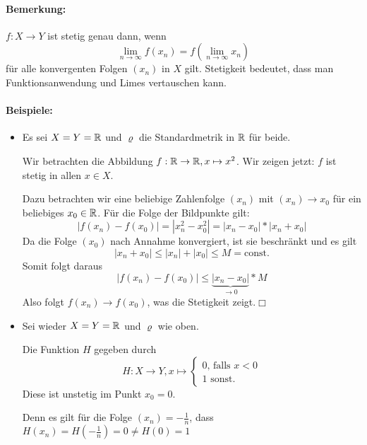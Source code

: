 \paragraph{Bemerkung:}
$f:X\rightarrow Y$ ist stetig genau dann, wenn
\begin{equation*}
	\lim\limits_{n\to\infty}f(x_n)=f(\lim\limits_{n\to\infty}x_n)
\end{equation*}
für alle konvergenten Folgen $(x_n)$ in $X$ gilt.
Stetigkeit bedeutet, dass man Funktionsanwendung und Limes vertauschen kann.

\paragraph{Beispiele:}
\begin{itemize}
	\item Es sei $X=Y=\mathbb{R}$ und $\varrho$ die Standardmetrik in $\mathbb{R}$ für beide.

	Wir betrachten die Abbildung $f:\mathbb{R}\rightarrow\mathbb{R},x\mapsto x^2$. Wir zeigen jetzt: $f$ ist stetig in allen $x\in X$.

	Dazu betrachten wir eine beliebige Zahlenfolge $(x_n)$ mit $(x_n)\to x_0$ für ein beliebiges $x_0\in\mathbb{R}$.
	Für die Folge der Bildpunkte gilt:
	\begin{equation*}
		|f(x_n)-f(x_0)|=|x_n^2-x_0^2|=|x_n-x_0|*|x_n+x_0|
	\end{equation*}
	Da die Folge $(x_0)$ nach Annahme konvergiert, ist sie beschränkt und es gilt
	\begin{equation*}
		|x_n+x_0|\leq|x_n|+|x_0|\leq M=\mathrm{const.}
	\end{equation*}
	Somit folgt daraus
	\begin{equation*}
		|f(x_n)-f(x_0)|\leq\underbrace{|x_n-x_0|}_{\to 0}*M
	\end{equation*}
	Also folgt $f(x_n)\to f(x_0)$, was die Stetigkeit zeigt.\hfill$\Box$

	\item Sei wieder $X=Y=\mathbb{R}$ und $\varrho$ wie oben.

	Die Funktion $H$ gegeben durch
	\begin{equation*}
		H:X\rightarrow Y, x\mapsto
		\begin{cases}
			0 \text{, falls }x<0\\
			1 \text{ sonst.}
		\end{cases}
	\end{equation*}
	Diese ist unstetig im Punkt $x_0=0$.

	Denn es gilt für die Folge $(x_n)=-\frac 1n$, dass $H(x_n)=H(-\frac 1n)=0\neq H(0)=1$
\end{itemize}

